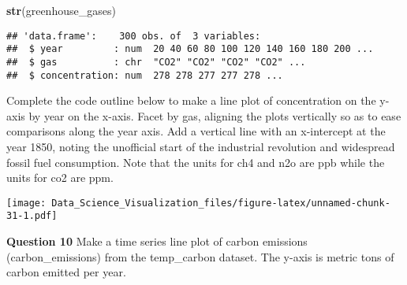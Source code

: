 \documentclass[]{article}
\newenvironment{Shaded}{\begin{snugshade}}{\end{snugshade}}
\newcommand{\DataTypeTok}[1]{\textcolor[rgb]{0.13,0.29,0.53}{#1}}
\newcommand{\DecValTok}[1]{\textcolor[rgb]{0.00,0.00,0.81}{#1}}
\newcommand{\KeywordTok}[1]{\textcolor[rgb]{0.13,0.29,0.53}{\textbf{#1}}}
\newcommand{\NormalTok}[1]{#1}
\newcommand{\OperatorTok}[1]{\textcolor[rgb]{0.81,0.36,0.00}{\textbf{#1}}}
\newcommand{\StringTok}[1]{\textcolor[rgb]{0.31,0.60,0.02}{#1}}
\begin{document}
\begin{Shaded}
\begin{Highlighting}[]
\KeywordTok{str}\NormalTok{(greenhouse_gases)}
\end{Highlighting}
\end{Shaded}

\begin{verbatim}
## 'data.frame':    300 obs. of  3 variables:
##  $ year         : num  20 40 60 80 100 120 140 160 180 200 ...
##  $ gas          : chr  "CO2" "CO2" "CO2" "CO2" ...
##  $ concentration: num  278 278 277 277 278 ...
\end{verbatim}

Complete the code outline below to make a line plot of concentration on
the y-axis by year on the x-axis. Facet by gas, aligning the plots
vertically so as to ease comparisons along the year axis. Add a vertical
line with an x-intercept at the year 1850, noting the unofficial start
of the industrial revolution and widespread fossil fuel consumption.
Note that the units for ch4 and n2o are ppb while the units for co2 are
ppm.

\begin{Shaded}
\end{Shaded}

\texttt{[image: Data\_Science\_Visualization\_files/figure-latex/unnamed-chunk-31-1.pdf]}

\textbf{Question 10} Make a time series line plot of carbon emissions
(carbon\_emissions) from the temp\_carbon dataset. The y-axis is metric
tons of carbon emitted per year.
\end{document}
